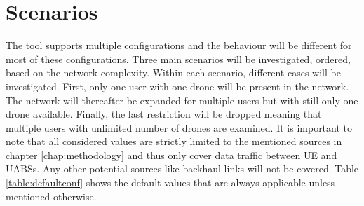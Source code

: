 \chapter{Scenarios}
\label{chap:scenarios}
The tool supports multiple configurations and the behaviour will be different for most of these configurations. Three main scenarios 
will be investigated, ordered, based on the network complexity. Within each scenario, different cases will be investigated.
First, only one user with one drone will be present in the network. The network will thereafter be expanded
for multiple users but with still only one drone available. Finally, the last restriction will be dropped meaning 
that multiple users with unlimited number of drones are examined.
It is important to note that 
all considered values are strictly limited to the mentioned sources in chapter \ref{chap:methodology} and thus only cover data traffic 
between \gls{UE} and \gls{UABS}s. Any other potential sources like backhaul links will not be covered.
Table \ref{table:defaultconf} shows the default values that are always applicable unless mentioned otherwise.

